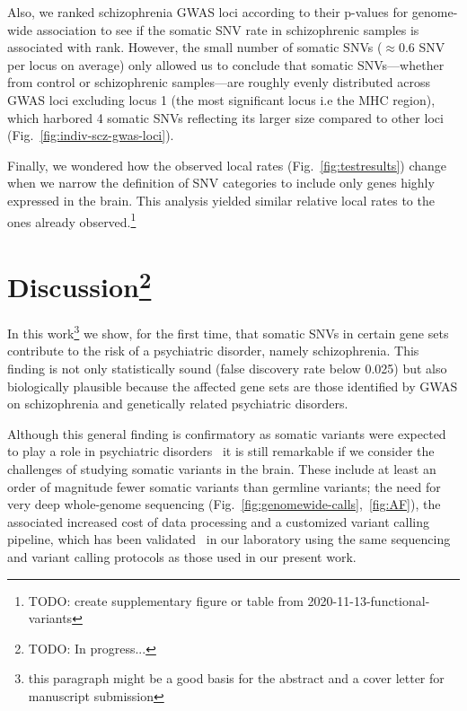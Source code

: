 \documentclass[letterpaper]{article}
\begin{document}
Also, we ranked schizophrenia GWAS loci according to their p-values for
genome-wide association to see if the somatic SNV rate in schizophrenic
samples is associated with rank.  However, the small number of somatic SNVs
($\approx 0.6$ SNV per locus on average) only allowed us to conclude that
somatic SNVs---whether from control or schizophrenic samples---are roughly
evenly distributed across GWAS loci excluding locus 1 (the most significant
locus i.e the MHC region), which harbored 4 somatic SNVs reflecting its larger
size compared to other loci (Fig.~\ref{fig:indiv-scz-gwas-loci}).

Finally, we wondered how the observed local rates (Fig.~\ref{fig:testresults})
change when we narrow the definition of SNV categories to include only genes
highly expressed in the brain.  This analysis yielded similar relative local
rates to the ones already observed.\footnote{TODO: create supplementary figure
	or table
from 2020-11-13-functional-variants}

\section*{Discussion\footnote{TODO: In progress...}}

In this work\footnote{this paragraph might be a good basis for the abstract
and a cover letter for manuscript submission} we show, for the first time,
that somatic SNVs in certain gene sets contribute to the risk of a psychiatric
disorder, namely schizophrenia.  This finding is not only statistically sound
(false discovery rate below 0.025) but also biologically plausible
because the affected gene sets are those identified by GWAS on schizophrenia
and genetically related psychiatric disorders.

Although this general finding is confirmatory as somatic variants were
expected to play a role in psychiatric disorders~\citep{McConnell2017} it is
still remarkable if we consider the challenges of studying somatic variants in
the brain.  These include at least an order of magnitude fewer somatic
variants than germline variants; the need for very deep whole-genome sequencing
(Fig.~\ref{fig:genomewide-calls},~\ref{fig:AF}), the associated increased
cost of data processing and a customized variant calling pipeline, which has
been validated~\citep{Wang2021} in our laboratory using the same sequencing
and variant calling protocols as those used in our present work.
\end{document}
